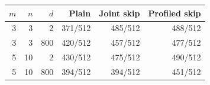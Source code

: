 \begin{tabular}{rrr rrr}
\toprule
$m$ & $n$ & $d$ & Plain & Joint skip & Profiled skip \\
\midrule
3 & 3 & 2 & 371/512 & 485/512 & 488/512 \\
3 & 3 & 800 & 420/512 & 457/512 & 477/512 \\
5 & 10 & 2 & 430/512 & 475/512 & 490/512 \\
5 & 10 & 800 & 394/512 & 394/512 & 451/512 \\
\bottomrule
\end{tabular}
